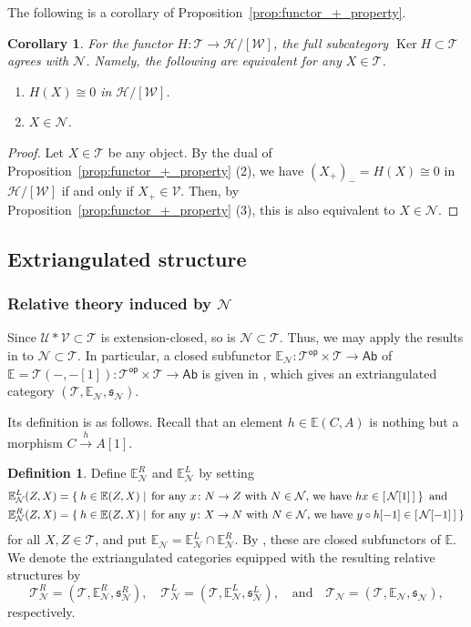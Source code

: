 \documentclass[a4paper,reqno,10pt]{amsart}
\newtheorem{corollary}[corollary]{Corollary}
\theoremstyle{definition}
\newtheorem{definition}[definition]{Definition}
\theoremstyle{definition}
\theoremstyle{definition}
\theoremstyle{definition}
\theoremstyle{plain}
\def\Ab{\mathsf{Ab}}
\newcommand{\op}{\mathsf{op}}
\newcommand{\Ker}{\operatorname{Ker}}
\newcommand{\xto}{\xrightarrow}
\newcommand{\fs}{\mathfrak{s}}
\newcommand{\BE}{\mathbb{E}}
\newcommand{\CH}{\mathcal{H}}
\newcommand{\CN}{\mathcal{N}}
\newcommand{\CT}{\mathcal{T}}
\newcommand{\CU}{\mathcal{U}}
\newcommand{\CV}{\mathcal{V}}
\newcommand{\CW}{\mathcal{W}}
\begin{document}
The following is a corollary of Proposition~\ref{prop:functor_+_property}.
\begin{corollary}\label{cor:Ker_H}
For the functor $H\colon\CT\to\CH/[\CW]$, the full subcategory $\Ker H\subset\CT$ agrees with $\CN$. Namely, the following are equivalent for any $X\in\CT$.
\begin{enumerate}
\item $H(X)\cong 0$ in $\CH/[\CW]$.
\item $X\in\CN$.
\end{enumerate}
\end{corollary}
\begin{proof}
Let $X\in\CT$ be any object. By the dual of Proposition~\ref{prop:functor_+_property} {\rm (2)}, we have $(X_+)_-=H(X)\cong 0$ in $\CH/[\CW]$ if and only if $X_+\in\CV$. Then, by Proposition~\ref{prop:functor_+_property} {\rm (3)}, this is also equivalent to $X\in\CN$.
\end{proof}

\subsection{Extriangulated structure}
\label{subsection:ET_heart}
\subsubsection{Relative theory induced by $\CN$}


Since $\CU\ast\CV\subset\CT$ is extension-closed, so is $\CN\subset\CT$. Thus, we may apply the results in \cite[Section~2]{Oga24} to $\CN\subset\CT$.
In particular, a closed subfunctor $\BE_{\CN}\colon\CT^\op\times\CT\to\Ab$ of $\BE=\CT(-,-[1])\colon\CT^\op\times\CT\to\Ab$ is given in \cite[Proposition~2.1]{Oga24}, which gives an extriangulated category $(\CT,\BE_{\CN},\fs_{\CN})$.

Its definition is as follows.
Recall that an element $h\in\BE(C,A)$ is nothing but a morphism $C\xto{h}A[1]$.

\begin{definition}\label{def:substructure_of_T}
Define $\BE^R_{\CN}$ and $\BE^L_{\CN}$ by setting
\begin{align*}
\BE^L_\CN(Z,X) 
    &= \Set{ h\in\BE(Z,X)  |\, \text{for any}\ x\colon N\to Z \text{ with } N\in\CN\text{, we have } hx\in[\,\CN[1]\,] }\ \text{and}\ \\
\BE^R_\CN(Z,X) 
    &= \Set{ h\in\BE(Z,X) |\, \text{for any}\ y\colon X\to N \text{ with } N\in\CN\text{, we have } y\circ h[-1]\in[\,\CN[-1]\,] }
\end{align*}
for all $X,Z\in\CT$, and put $\BE_\CN=\BE^L_\CN\cap\BE^R_\CN$.
By \cite[Proposition~2.1]{Oga24}, these are closed subfunctors of $\BE$.
We denote the extriangulated categories equipped with the resulting relative structures by
\[
\CT_{\CN}^R=(\CT,\BE_\CN^R,\fs_\CN^R),  \quad\CT_{\CN}^L=(\CT,\BE_\CN^L,\fs_\CN^L),\quad \text{and}\quad \CT_{\CN}=(\CT,\BE_\CN,\fs_\CN), 
\]
respectively.
\end{definition}
\end{document}
